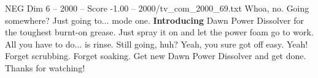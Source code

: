 \begin{textsample}{NEG Dim 6 – 2000 – Score -1.00 – 2000/tv\_com\_2000\_69.txt}  \label{ex:f6_neg_018}
Whoa, no.
Going somewhere?
Just going to... mode one. \textbf{Introducing} Dawn Power Dissolver for the toughest burnt-on grease.
Just spray it on and let the power foam go to work.
All you have to do... is rinse.
Still going, huh?
Yeah, you sure got off easy.
Yeah!
Forget scrubbing.
Forget soaking.
Get new Dawn Power Dissolver and get done.
Thanks for watching!

\end{textsample}
